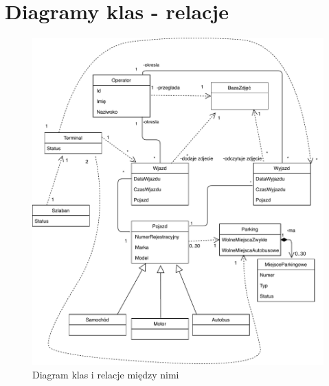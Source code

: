 
\section{Diagramy klas  - relacje}
\label{sec:diagKlas}
\begin{figure}[H]
	\centering
	\includegraphics[width=150mm]{diagramy/DiagKlas.pdf}
	\caption{Diagram klas i relacje między nimi \label{overflow}}
\end{figure}



